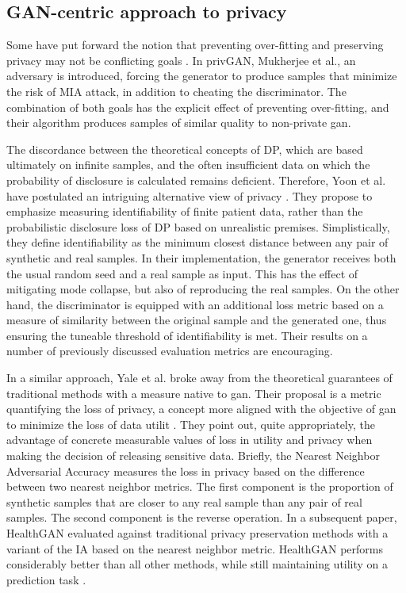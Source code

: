 \subsection{GAN-centric approach to privacy}
Some have put forward the notion that preventing over-fitting and preserving privacy may not be conflicting goals \cite{Wu2019-ui,Mukherjee2019-vu}. In privGAN, Mukherjee et al., an adversary is introduced, forcing the generator to produce samples that minimize the risk of MIA attack, in addition to cheating the discriminator. The combination of both goals has the explicit effect of preventing over-fitting, and their algorithm produces samples of similar quality to non-private \gls{gan}.\par
The discordance between the theoretical concepts of DP, which are  based ultimately on infinite samples, and the often insufficient data on which the probability of disclosure is calculated remains deficient. Therefore, Yoon et al. have postulated an intriguing alternative view of privacy \cite{Yoon2020-anon}. They propose to emphasize measuring identifiability of finite patient data, rather than the probabilistic disclosure loss of DP based on unrealistic premises. Simplistically, they define identifiability as the minimum closest distance between any pair of synthetic and real samples. In their implementation, the generator receives both the usual random seed and a real sample as input. This has the effect of mitigating mode collapse, but also of reproducing the real samples. On the other hand, the discriminator is equipped with an additional loss metric based on a measure of similarity between the original sample and the generated one, thus ensuring the tuneable threshold of identifiability is met. Their results on a number of previously discussed evaluation metrics are encouraging.\par
In a similar approach, Yale et al. broke away from the theoretical guarantees of traditional methods with a measure native to \gls{gan}. Their proposal is a metric quantifying the loss of privacy, a concept more aligned with the objective of \gls{gan} to minimize the loss of data utilit \cite{yale:hal-02160496,p2019}. They point out, quite appropriately, the advantage of concrete measurable values of loss in utility and privacy when making the decision of releasing sensitive data. Briefly, the Nearest Neighbor Adversarial Accuracy measures the loss in privacy based on the difference between two nearest neighbor metrics. The  first component is the proportion of synthetic samples that are closer to any real sample than any pair of real samples. The second component is the reverse operation. In a subsequent paper, HealthGAN evaluated against traditional privacy preservation methods with a variant of the IA based on the nearest neighbor metric. HealthGAN performs considerably better than all other methods, while still maintaining utility on a prediction task .


       



